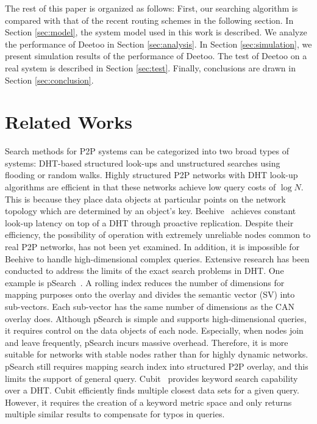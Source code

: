 \documentclass[9.5pt,journal,final,finalsubmission,twocolumn]{IEEEtran}
\begin{document}
The rest of this paper is organized as follows: First, our searching
algorithm is compared with that of the recent routing schemes in the following section. 
In Section \ref{sec:model}, the system model
used in this work is described. We analyze the performance of Deetoo in
Section \ref{sec:analysis}. In Section \ref{sec:simulation}, we present
simulation results of the performance of Deetoo. 
The test of Deetoo on a real system is described in Section 
\ref{sec:test}. 
Finally, conclusions are 
drawn in Section \ref{sec:conclusion}.

\section{Related Works}
\label{sec:related_works}
Search methods for P2P systems can be categorized into two broad 
types of systems: DHT-based structured look-ups and unstructured searches using
flooding or random walks.
Highly structured P2P networks with DHT look-up algorithms 
\cite{is:Chord, CAN, bz:Tapestry, pr:Symphony} 
are efficient in that these networks achieve low query costs of 
$\log{N}$. This is because they place data objects at particular 
points on the network topology
which are determined by an object's key. Beehive~\cite{re:beehive04} 
achieves constant look-up latency on top of a
DHT through proactive replication. Despite their efficiency, the possibility 
of operation with extremely unreliable nodes common to real P2P networks, has not been yet
examined. In addition, it is impossible for Beehive to handle
high-dimensional complex queries.  Extensive research has been conducted 
to address the limits of the exact search problems in DHT.
One example is pSearch~\cite{psearch}.
A rolling index reduces the number of dimensions for mapping purposes 
onto the overlay and divides the semantic vector (SV) into sub-vectors. 
Each sub-vector has the same number of dimensions as the CAN overlay does.
Although pSearch is simple and supports high-dimensional queries, 
it requires control on the data objects of each node. Especially, when 
nodes join and leave frequently, pSearch incurs massive overhead.
Therefore, it is more suitable for networks with stable nodes rather than
for highly dynamic networks.
pSearch still requires mapping search index into structured P2P overlay, and
this limits the support of general query.
Cubit~\cite{cubit} provides keyword search capability over a DHT. Cubit 
efficiently finds multiple closest data sets for a given query. However, 
it requires the creation of a keyword metric space and only returns multiple similar results
to compensate for typos in queries. 
\end{document}
